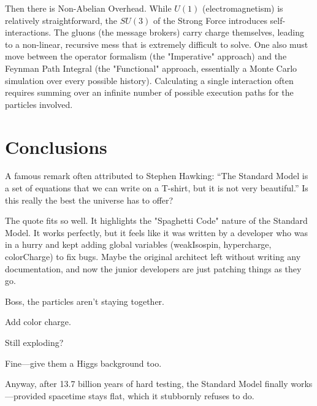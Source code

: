 Then there is Non-Abelian Overhead. While $U(1)$ (electromagnetism) is relatively straightforward, the $SU(3)$ of the Strong Force introduces self-interactions.
The gluons (the message brokers) carry charge themselves, leading to a non-linear, recursive mess that is extremely difficult to solve.
One also must move between the operator formalism (the "Imperative" approach) and the Feynman Path Integral (the "Functional" approach,
essentially a Monte Carlo simulation over every possible history).
Calculating a single interaction often requires summing over an infinite number of possible execution paths for the particles involved.

\section{Conclusions}

A famous remark often attributed to Stephen Hawking: ``The Standard Model is a set of equations that we can write on a T-shirt, but it is not very beautiful.''
Is this really the best the universe has to offer?

The quote fits so well. It highlights the "Spaghetti Code" nature of the Standard Model.
It works perfectly, but it feels like it was written by a developer who was in a hurry and kept adding global variables (weakIsospin, hypercharge, colorCharge) to fix bugs.
Maybe the original architect left without writing any documentation, and now the junior developers are just patching things as they go.

Boss, the particles aren’t staying together.

Add color charge.

Still exploding?

Fine—give them a Higgs background too.

Anyway, after 13.7 billion years of hard testing, the Standard Model finally works—provided spacetime stays flat, which it stubbornly refuses to do.
